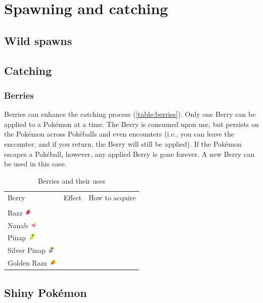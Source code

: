 \chapter{Spawning and catching}
\label{chap:spawn}

\section{Wild spawns}
\label{sec:spawns}

\section{Catching}
\label{sec:catch}

\subsection{Berries}
Berries can enhance the catching process (\autoref{table:berries}).
Only one Berry can be applied to a Pokémon at a time.
The Berry is consumed upon use, but persists on the Pokémon across Pokéballs
  and even encounters (i.e., you can leave the encounter, and if you return,
  the Berry will still be applied).
If the Pokémon escapes a Pokéball, however, any applied Berry is gone forever.
A new Berry can be used in this case.

\begin{table}[ht]
\begin{center}
\begin{tabular}{lll}
Berry & Effect & How to acquire \\
\Midrule\\
Razz \includegraphics[width=1em]{images/razz.png} & & \\
Nanab \includegraphics[width=1em]{images/nanab.png} & & \\
Pinap \includegraphics[width=1em]{images/pinap.png} & & \\
Silver Pinap \includegraphics[width=1em]{images/silverpinap.png} & &\\
Golden Razz \includegraphics[width=1em]{images/goldenrazz.png} & & \\
\end{tabular}
\end{center}
\caption{Berries and their uses}
\label{table:berries}
\end{table}

\section{Shiny Pokémon}
\label{sec:shiny}
